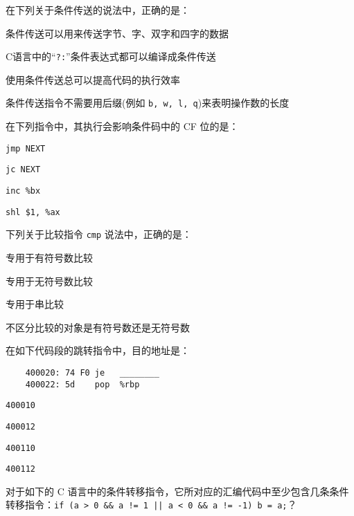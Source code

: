 \begin{problems}
\begin{choices}
        \end{choices}
         在下列关于条件传送的说法中，正确的是：
        \begin{choices}
            \item 条件传送可以用来传送字节、字、双字和四字的数据
            \item C语言中的“\verb|?:|”条件表达式都可以编译成条件传送
            \item 使用条件传送总可以提高代码的执行效率
            \item 条件传送指令不需要用后缀(例如 \verb|b, w, l, q|)来表明操作数的长度
        \end{choices}
         在下列指令中，其执行会影响条件码中的 CF 位的是：
        \begin{choices}
            \item \verb|jmp NEXT|
            \item \verb|jc NEXT|
            \item \verb|inc %bx|
            \item \verb|shl $1, %ax|
        \end{choices}
         下列关于比较指令 \verb|cmp| 说法中，正确的是：
        \begin{choices}
            \item 专用于有符号数比较
            \item 专用于无符号数比较
            \item 专用于串比较
            \item 不区分比较的对象是有符号数还是无符号数
        \end{choices}
         在如下代码段的跳转指令中，目的地址是：
        \begin{verbatim}
    400020: 74 F0 je   ________
    400022: 5d    pop  %rbp
        \end{verbatim}
        \begin{choices}
            \item \texttt{400010}
            \item \texttt{400012}
            \item \texttt{400110}
            \item \texttt{400112}
        \end{choices}
         对于如下的 C 语言中的条件转移指令，它所对应的汇编代码中至少包含几条条件转移指令：\verb+if (a > 0 && a != 1 || a < 0 && a != -1) b = a;+？
        \begin{choices}

\end{choices}
\end{problems}
